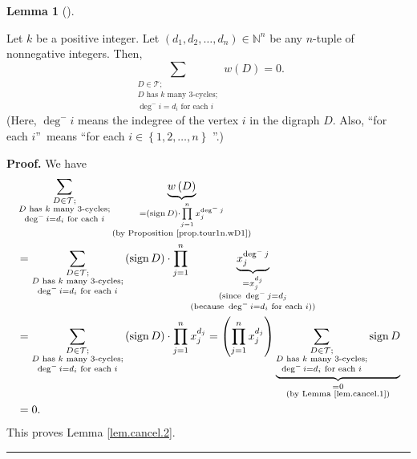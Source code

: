 \documentclass[numbers=enddot,12pt,final,onecolumn,notitlepage]{scrartcl}%
\numberwithin{exer}{subsection}
\theoremstyle{definition}
\newtheorem{lem}[theo]{Lemma}
\newenvironment{lemma}[1][]
{\begin{lem}[#1]\begin{leftbar}}
{\end{leftbar}\end{lem}}
\newenvironment{proof}[1][Proof]{\noindent\textbf{#1.} }{\ \rule{0.5em}{0.5em}}
\let\sumnonlimits\sum
\let\prodnonlimits\prod
\renewcommand{\sum}{\sumnonlimits\limits}
\renewcommand{\prod}{\prodnonlimits\limits}
\begin{document}
\begin{lemma}
\label{lem.cancel.2}Let $k$ be a positive integer. Let $\left(  d_{1}%
,d_{2},\ldots,d_{n}\right)  \in\mathbb{N}^{n}$ be any $n$-tuple of nonnegative
integers. Then,%
\[
\sum_{\substack{D\in\mathcal{T};\\D\text{ has }k\text{ many }3\text{-cycles}%
;\\\deg^{-}i=d_{i}\text{ for each }i}}w\left(  D\right)  =0.
\]
(Here, $\deg^{-}i$ means the indegree of the vertex $i$ in the digraph $D$.
Also, \textquotedblleft for each $i$\textquotedblright\ means
\textquotedblleft for each $i\in\left\{  1,2,\ldots,n\right\}  $%
\textquotedblright.)
\end{lemma}

\begin{proof}
We have%
\begin{align*}
&  \sum_{\substack{D\in\mathcal{T};\\D\text{ has }k\text{ many }%
3\text{-cycles};\\\deg^{-}i=d_{i}\text{ for each }i}}\underbrace{w\left(
D\right)  }_{\substack{=\left(  \operatorname*{sign}D\right)  \cdot\prod
_{j=1}^{n}x_{j}^{\deg^{-}j}\\\text{(by Proposition \ref{prop.tour1n.wD1})}}}\\
&  =\sum_{\substack{D\in\mathcal{T};\\D\text{ has }k\text{ many }%
3\text{-cycles};\\\deg^{-}i=d_{i}\text{ for each }i}}\left(
\operatorname*{sign}D\right)  \cdot\prod_{j=1}^{n}\underbrace{x_{j}^{\deg
^{-}j}}_{\substack{=x_{j}^{d_{j}}\\\text{(since }\deg^{-}j=d_{j}%
\\\text{(because }\deg^{-}i=d_{i}\text{ for each }i\text{))}}}\\
&  =\sum_{\substack{D\in\mathcal{T};\\D\text{ has }k\text{ many }%
3\text{-cycles};\\\deg^{-}i=d_{i}\text{ for each }i}}\left(
\operatorname*{sign}D\right)  \cdot\prod_{j=1}^{n}x_{j}^{d_{j}}=\left(
\prod_{j=1}^{n}x_{j}^{d_{j}}\right)  \underbrace{\sum_{\substack{D\in
\mathcal{T};\\D\text{ has }k\text{ many }3\text{-cycles};\\\deg^{-}%
i=d_{i}\text{ for each }i}}\operatorname*{sign}D}_{\substack{=0\\\text{(by
Lemma \ref{lem.cancel.1})}}}\\
&  =0.
\end{align*}
This proves Lemma \ref{lem.cancel.2}.
\end{proof}
\end{document}
